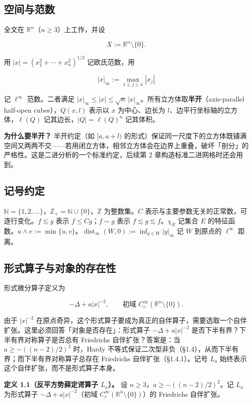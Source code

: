 \documentclass[a4paper,11pt,openany]{ctexbook}
\numberwithin{equation}{chapter}
\numberwithin{figure}{chapter}
\numberwithin{table}{chapter}
\begin{document}
\subsection{空间与范数}

全文在 $\mathbb R^n$（$n\ge 3$）上工作，并设

$$X := \mathbb R^n\setminus\{0\}.$$

用 $|x|=(x_1^2+\cdots+x_n^2)^{1/2}$ 记欧氏范数，用

$$|x|_\infty := \max_{1\le j\le n}|x_j|$$

记 $\ell^\infty$ 范数。二者满足 $|x|_\infty\le |x|\le\sqrt n\,|x|_\infty$。所有立方体取\textbf{半开}（axis-parallel half-open cubes），$Q(x,l)$ 表示以 $x$ 为中心、边长为 $l$、边平行坐标轴的立方体，$\ell(Q)$ 记其边长，$|Q|=\ell(Q)^n$ 记其体积。

\textbf{为什么要半开？} 半开约定（如 $[a,a+l)$ 的形式）保证同一尺度下的立方体既铺满空间又两两不交——若用闭立方体，相邻立方体会在边界上重叠，破坏「剖分」的严格性。这是二进分析的一个标准约定，后续第 2 章构造标准二进网格时还会用到。

\subsection{记号约定}

$\mathbb N=\{1,2,\dots\}$，$\mathbb Z_+=\mathbb N\cup\{0\}$，$\mathbb Z$ 为整数集。$C$ 表示与主要参数无关的正常数，可逐行变化。$f\lesssim g$ 表示 $f\le Cg$；$f\sim g$ 表示 $f\lesssim g\lesssim f$。$\chi_E$ 记集合 $E$ 的特征函数。$u\wedge v:=\min\{u,v\}$。$\operatorname{dist}_\infty(W,0):=\inf_{y\in W}|y|_\infty$ 记 $W$ 到原点的 $\ell^\infty$ 距离。

\subsection{形式算子与对象的存在性}

形式微分算子定义为

$$-\Delta + a|x|^{-2},\qquad \text{初域 } C_c^\infty(\mathbb R^n\setminus\{0\}).$$

由于 $|x|^{-2}$ 在原点奇异，这个形式算子要成为真正的自伴算子，需要选取一个自伴扩张。这里必须回答「对象是否存在」：形式算子 $-\Delta+a|x|^{-2}$ 是否下半有界？下半有界对称算子是否总有 Friedrichs 自伴扩张？答案是：当 $a\ge-((n-2)/2)^2$ 时，Hardy 不等式保证二次型非负（§1.4），从而下半有界；而下半有界对称算子总存在 Friedrichs 自伴扩张（§1.4.1）。记号 $L_a$ 始终表示这个自伴扩张，而不是形式算子本身。

\textbf{定义 1.1（反平方势薛定谔算子 $L_a$）。} 设 $n\ge 3$，$a\ge-((n-2)/2)^2$。记 $L_a$ 为形式算子 $-\Delta+a|x|^{-2}$（初域 $C_c^\infty(\mathbb R^n\setminus\{0\})$）的 Friedrichs 自伴扩张。
\end{document}
